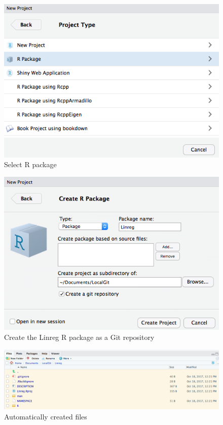 \documentclass[]{book}
\theoremstyle{definition}
\theoremstyle{definition}
\theoremstyle{definition}
\theoremstyle{remark}
\begin{document}
\begin{figure}

{\centering \includegraphics{images/ch3_pkg_3_package} 

}

\caption{Select R package}\label{fig:pkg3}
\end{figure}

\begin{figure}

{\centering \includegraphics{images/ch3_pkg_4_create} 

}

\caption{Create the Linreg R package as a Git repository}\label{fig:pkg4}
\end{figure}

\begin{figure}

{\centering \includegraphics{images/ch3_pkg_5_filelist} 

}

\caption{Automatically created files}\label{fig:pkg5}
\end{figure}
\end{document}
